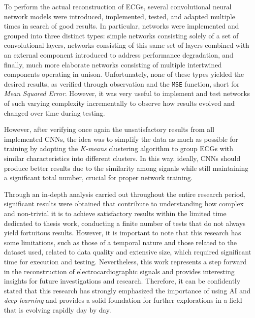 \documentclass[12pt,italian]{report}
\newcommand\blankpage{
    \null
    \thispagestyle{empty}
    \addtocounter{page}{-1}
    \newpage}
\begin{document}
To perform the actual reconstruction of ECGs, several convolutional neural network models were introduced, implemented, tested, and adapted multiple times in search of good results. In particular, networks were implemented and grouped into three distinct types: simple networks consisting solely of a set of convolutional layers, networks consisting of this same set of layers combined with an external component introduced to address performance degradation, and finally, much more elaborate networks consisting of multiple intertwined components operating in unison. Unfortunately, none of these types yielded the desired results, as verified through observation and the \texttt{MSE} function, short for \textit{Mean Squared Error}. However, it was very useful to implement and test networks of such varying complexity incrementally to observe how results evolved and changed over time during testing.

However, after verifying once again the unsatisfactory results from all implemented CNNs, the idea was to simplify the data as much as possible for training by adopting the \textit{K-means} clustering algorithm to group ECGs with similar characteristics into different clusters. In this way, ideally, CNNs should produce better results due to the similarity among signals while still maintaining a significant total number, crucial for proper network training.

Through an in-depth analysis carried out throughout the entire research period, significant results were obtained that contribute to understanding how complex and non-trivial it is to achieve satisfactory results within the limited time dedicated to thesis work, conducting a finite number of tests that do not always yield fortuitous results. However, it is important to note that this research has some limitations, such as those of a temporal nature and those related to the dataset used, related to data quality and extensive size, which required significant time for execution and testing. Nevertheless, this work represents a step forward in the reconstruction of electrocardiographic signals and provides interesting insights for future investigations and research. Therefore, it can be confidently stated that this research has strongly emphasized the importance of using AI and \textit{deep learning} and provides a solid foundation for further explorations in a field that is evolving rapidly day by day.

\afterpage{\blankpage}




\afterpage{\blankpage}
\end{document}
